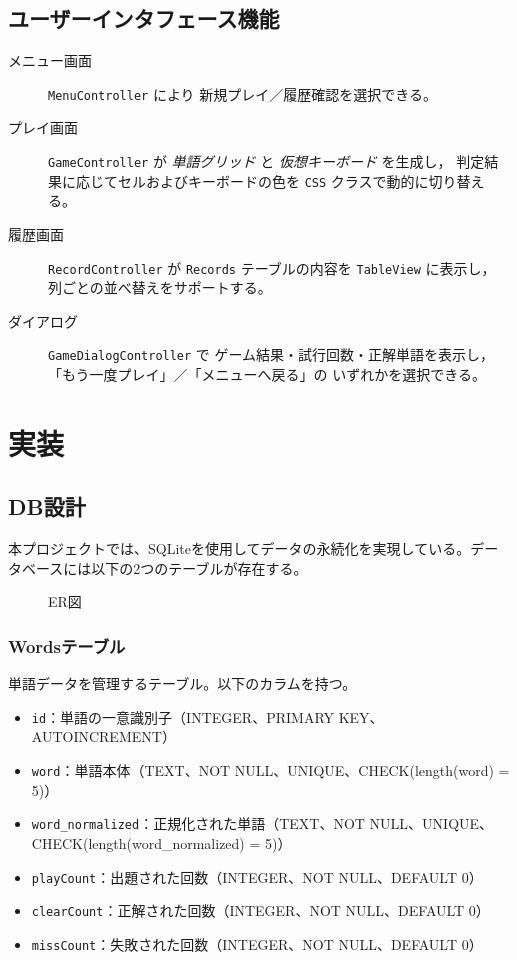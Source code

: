 \documentclass[a4j]{ujarticle}
\begin{document}
\subsection{ユーザーインタフェース機能}
\begin{description}
  \item[メニュー画面]%
    \texttt{MenuController} により
    新規プレイ／履歴確認を選択できる。
  \item[プレイ画面]%
    \texttt{GameController} が
    \emph{単語グリッド} と \emph{仮想キーボード} を生成し，
    判定結果に応じてセルおよびキーボードの色を
    \texttt{CSS} クラスで動的に切り替える。
  \item[履歴画面]%
    \texttt{RecordController} が
    \texttt{Records} テーブルの内容を
    \texttt{TableView} に表示し，
    列ごとの並べ替えをサポートする。
  \item[ダイアログ]%
    \texttt{GameDialogController} で
    ゲーム結果・試行回数・正解単語を表示し，
    「もう一度プレイ」／「メニューへ戻る」の
    いずれかを選択できる。
\end{description}

\section{実装}
\subsection{DB設計}
本プロジェクトでは、SQLiteを使用してデータの永続化を実現している。データベースには以下の2つのテーブルが存在する。

\begin{figure}[h]
\centering
\caption{ER図}
\label{fig:er}
\end{figure}

\subsubsection{Wordsテーブル}
単語データを管理するテーブル。以下のカラムを持つ。
\begin{itemize}
  \item \texttt{id}：単語の一意識別子（INTEGER、PRIMARY KEY、AUTOINCREMENT）
  \item \texttt{word}：単語本体（TEXT、NOT NULL、UNIQUE、CHECK(length(word) = 5)）
  \item \texttt{word\_normalized}：正規化された単語（TEXT、NOT NULL、UNIQUE、CHECK(length(word\_normalized) = 5)）
  \item \texttt{playCount}：出題された回数（INTEGER、NOT NULL、DEFAULT 0）
  \item \texttt{clearCount}：正解された回数（INTEGER、NOT NULL、DEFAULT 0）
  \item \texttt{missCount}：失敗された回数（INTEGER、NOT NULL、DEFAULT 0）
\end{itemize}
\end{document}
